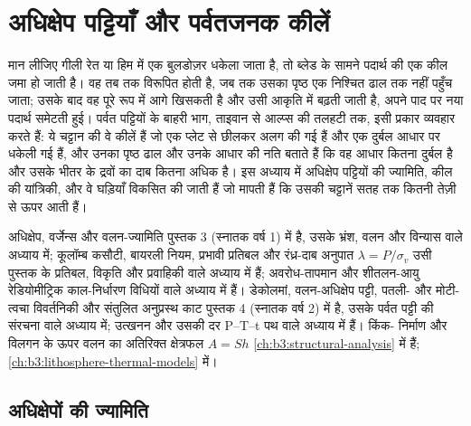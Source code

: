 \chapter{अधिक्षेप पट्टियाँ और पर्वतजनक कीलें}\label{ch:b3:orogenic-wedges}

मान लीजिए गीली रेत या हिम में एक बुलडोज़र धकेला जाता है, तो ब्लेड के
सामने पदार्थ की एक कील जमा हो जाती है। वह तब तक विरूपित होती है, जब तक उसका पृष्ठ एक निश्चित ढाल तक नहीं पहुँच जाता;
उसके बाद वह पूरे रूप में आगे खिसकती है और उसी आकृति में बढ़ती जाती है,
अपने पाद पर नया पदार्थ समेटती हुई। पर्वत पट्टियों के बाहरी भाग, ताइवान से
आल्प्स की तलहटी तक, इसी प्रकार व्यवहार करते हैं: ये चट्टान की वे कीलें हैं
जो एक प्लेट से छीलकर अलग की गई हैं और एक दुर्बल आधार पर धकेली गई हैं, और उनका पृष्ठ
ढाल और उनके आधार की नति बताते हैं कि वह आधार कितना दुर्बल है और उसके भीतर के द्रवों का
दाब कितना अधिक है। इस अध्याय में अधिक्षेप पट्टियों की ज्यामिति,
कील की यांत्रिकी, और वे घड़ियाँ विकसित की जाती हैं जो मापती हैं कि उसकी
चट्टानें सतह तक कितनी तेज़ी से ऊपर आती हैं।

\begin{recall}
अधिक्षेप, वर्जेन्स और वलन-ज्यामिति पुस्तक 3 (स्नातक वर्ष 1) में है, उसके
भ्रंश, वलन और विन्यास वाले अध्याय में; कूलॉम्ब कसौटी, बायरली नियम, प्रभावी प्रतिबल और
रंध्र-दाब अनुपात $\lambda = P/\sigma_v$ उसी पुस्तक के प्रतिबल, विकृति और
प्रवाहिकी वाले अध्याय में हैं; अवरोध-तापमान और शीतलन-आयु
रेडियोमीट्रिक काल-निर्धारण विधियों वाले अध्याय में हैं। डेकोलमां,
वलन-अधिक्षेप पट्टी, पतली- और मोटी-त्वचा विवर्तनिकी और संतुलित
अनुप्रस्थ काट पुस्तक 4 (स्नातक वर्ष 2) में है, उसके पर्वत पट्टी की
संरचना वाले अध्याय में; उत्खनन और उसकी दर P--T--t पथ वाले अध्याय में हैं। किंक-
निर्माण और विलगन के ऊपर वलन का अतिरिक्त क्षेत्रफल $A = Sh$
\cref{ch:b3:structural-analysis} में हैं; 
\cref{ch:b3:lithosphere-thermal-models} में।
\end{recall}

\section{अधिक्षेपों की ज्यामिति}\label{sec:b3:orogenic-wedges:geometry}

